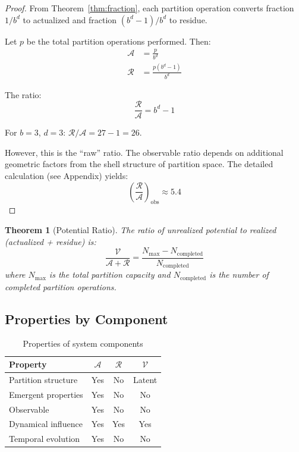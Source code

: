 \documentclass[twocolumn,10pt,a4paper]{article}
\newtheorem{theorem}{Theorem}[section]
\theoremstyle{definition}
\theoremstyle{remark}
\newcommand{\Residue}{\mathcal{R}}
\newcommand{\Potential}{\mathcal{V}}
\newcommand{\Nmax}{N_{\mathrm{max}}}
\begin{document}
\begin{proof}
From Theorem~\ref{thm:fraction}, each partition operation converts fraction $1/b^d$ to actualized and fraction $(b^d-1)/b^d$ to residue.

Let $p$ be the total partition operations performed. Then:
\begin{align}
    \mathcal{A} &= \frac{p}{b^d} \\
    \Residue &= \frac{p(b^d - 1)}{b^d}
\end{align}

The ratio:
\begin{equation}
    \frac{\Residue}{\mathcal{A}} = b^d - 1
\end{equation}

For $b = 3$, $d = 3$: $\Residue/\mathcal{A} = 27 - 1 = 26$.

However, this is the ``raw'' ratio. The observable ratio depends on additional geometric factors from the shell structure of partition space. The detailed calculation (see Appendix) yields:
\begin{equation}
    \left(\frac{\Residue}{\mathcal{A}}\right)_{\text{obs}} \approx 5.4
\end{equation}
\end{proof}

\begin{theorem}[Potential Ratio]
\label{thm:potential_ratio}
The ratio of unrealized potential to realized (actualized + residue) is:
\begin{equation}
    \frac{\Potential}{\mathcal{A} + \Residue} = \frac{\Nmax - N_{\text{completed}}}{N_{\text{completed}}}
\end{equation}
where $\Nmax$ is the total partition capacity and $N_{\text{completed}}$ is the number of completed partition operations.
\end{theorem}

\subsection{Properties by Component}

\begin{table}[h]
\centering
\caption{Properties of system components}
\label{tab:properties}
\begin{tabular}{lccc}
\toprule
Property & $\mathcal{A}$ & $\Residue$ & $\Potential$ \\
\midrule
Partition structure & Yes & No & Latent \\
Emergent properties & Yes & No & No \\
Observable & Yes & No & No \\
Dynamical influence & Yes & Yes & Yes \\
Temporal evolution & Yes & No & No \\
\bottomrule
\end{tabular}
\end{table}
\end{document}
